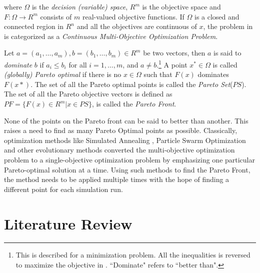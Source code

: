 where $\Omega$ is the \textit{decision (variable) space}, $R^m$ is the objective space and $F : \Omega \rightarrow R^m$ consists of $m$ real-valued objective functions. If $\Omega$ is a closed and connected region in $R^n$ and all the objectives are continuous of $x$, the problem in  is categorized as a \textit{Continuous Multi-Objective Optimization Problem}.

Let $a = (a_1, \ldots , a_m), b = (b_1, \ldots , b_m) \in R^m$ be two vectors, then $a$ is said to \textit{dominate} $b$ if $a_i \leq b_i$ for all $i = 1, \ldots, m$, and $a \neq b$.\footnote{This is described for a minimization problem. All the inequalities is reversed to maximize the objective in \cite{miettinen99}. ``Dominate" refers to ``better than".} A point $x^* \in \Omega$ is called \textit{(globally) Pareto optimal} if there is no $x \in \Omega$ such that $F(x)$ dominates $F(x*)$. The set of all the Pareto optimal points is called the \textit{Pareto Set}($PS$). The set of all the Pareto objective vectors is defined as $PF = \{ F(x) \in R^m | x \in PS\}$, is called the \textit{Pareto Front}\cite{miettinen99}.

None of the points on the Pareto front can be said to better than another. This raises a need to find as many Pareto Optimal points as possible. Classically, optimization methods like Simulated Annealing \cite{kirkpatrick83}, Particle Swarm Optimization \cite{kennedy95} and other evolutionary methods\cite{fonseca93} converted the multi-objective optimization problem to a single-objective optimization problem by emphasizing one particular Pareto-optimal solution at a time. Using such methods to find the Pareto Front, the method needs to be applied multiple times with the hope of finding a different point for each simulation run.


\section{Literature Review}
\label{sec:bg:lr}

